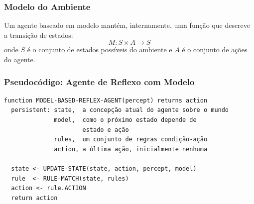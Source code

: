 \documentclass{beamer}
\begin{document}
\begin{frame}
\frametitle{Modelo do Ambiente}
Um agente baseado em modelo mantém, internamente, uma função que descreve a transição de estados:
\[
M: S \times A \rightarrow S
\]
onde \( S \) é o conjunto de estados possíveis do ambiente e \( A \) é o conjunto de ações do agente.
\end{frame}

\begin{frame}[fragile]
\frametitle{Pseudocódigo: Agente de Reflexo com Modelo}
\footnotesize
\begin{verbatim}
function MODEL-BASED-REFLEX-AGENT(percept) returns action
  persistent: state,  a concepção atual do agente sobre o mundo
              model,  como o próximo estado depende de
                      estado e ação
              rules,  um conjunto de regras condição-ação
              action, a última ação, inicialmente nenhuma

  state <- UPDATE-STATE(state, action, percept, model)
  rule  <- RULE-MATCH(state, rules)
  action <- rule.ACTION
  return action
\end{verbatim}
\end{frame}
\end{document}
